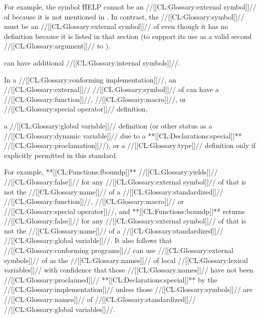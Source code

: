 For example, the symbol \f{HELP} cannot be an //[[CL:Glossary:external symbol]]// of  because it is not mentioned in \secref\CLsymbols. In contrast, the //[[CL:Glossary:symbol]]//  must be an //[[CL:Glossary:external symbol]]// of   even though it has no definition because it is listed in that section (to support its use as a valid second //[[CL:Glossary:argument]]// to ). 

 can have additional //[[CL:Glossary:internal symbols]]//.


 In a //[[CL:Glossary:conforming implementation]]//, an //[[CL:Glossary:external]]// //[[CL:Glossary:symbol]]// of  can have
   a //[[CL:Glossary:function]]//, //[[CL:Glossary:macro]]//, or //[[CL:Glossary:special operator]]// definition, 

   a //[[CL:Glossary:global variable]]// definition
   (or other status as a //[[CL:Glossary:dynamic variable]]// 
    due to a **[[CL:Declarations:special]]** //[[CL:Glossary:proclamation]]//), or a //[[CL:Glossary:type]]// definition only if explicitly permitted in this standard.

For example,
  **[[CL:Functions:fboundp]]** //[[CL:Glossary:yields]]// //[[CL:Glossary:false]]// 
  for any //[[CL:Glossary:external symbol]]// of  
  that is not the //[[CL:Glossary:name]]// of a //[[CL:Glossary:standardized]]// 
   //[[CL:Glossary:function]]//, //[[CL:Glossary:macro]]// or //[[CL:Glossary:special operator]]//, and
  **[[CL:Functions:boundp]]** returns //[[CL:Glossary:false]]// 
  for any //[[CL:Glossary:external symbol]]// of  
  that is not the //[[CL:Glossary:name]]// of a //[[CL:Glossary:standardized]]// //[[CL:Glossary:global variable]]//. It also follows that
  //[[CL:Glossary:conforming programs]]// can use //[[CL:Glossary:external symbols]]// of  
  as the //[[CL:Glossary:names]]// of local //[[CL:Glossary:lexical variables]]// 
  with confidence that those //[[CL:Glossary:names]]// have not been //[[CL:Glossary:proclaimed]]// **[[CL:Declarations:special]]** 
  by the //[[CL:Glossary:implementation]]//
  unless those //[[CL:Glossary:symbols]]// are
    //[[CL:Glossary:names]]// of //[[CL:Glossary:standardized]]// //[[CL:Glossary:global variables]]//.


